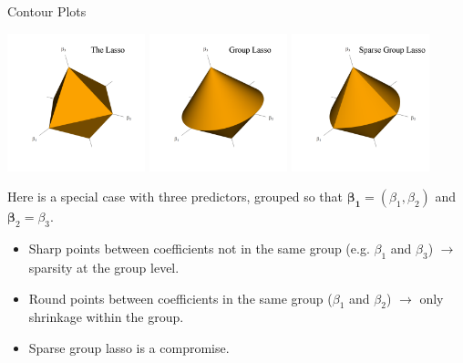 \documentclass[8pt]{beamer}
\begin{document}
\begin{frame}{Contour Plots}

\begin{center}
    \includegraphics[width = 0.3\textwidth]{3D_cont_lasso.pdf}
    \includegraphics[width = 0.3\textwidth]{3D_cont_glasso.pdf}
    \includegraphics[width = 0.3\textwidth]{3D_cont_sglasso.pdf}
\end{center}

Here is a special case with three predictors, grouped so that $\bm{\beta_1} = (\beta_1, \beta_2)$ and $\bm{\beta}_2 = \beta_3$.
\begin{itemize}
    \item Sharp points between coefficients not in the same group (e.g. $\beta_1$ and $\beta_3$) $\to$ sparsity at the group level.
    \item Round points between coefficients in the same group ($\beta_1$ and $\beta_2$) $\to$ only shrinkage within the group.
    \item Sparse group lasso is a compromise.
\end{itemize}
    
\end{frame}
\end{document}
